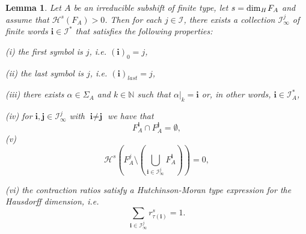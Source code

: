 \documentclass[11pt,english,british]{article}
\numberwithin{equation}{section}
\newtheorem{lma}[thm]{Lemma}
\begin{document}
\begin{lma} \label{exhaust}
Let $A$ be an irreducible subshift of finite type, let $s=\dim_{\emph{H}}F_{A}$
and assume that $\mathcal{H}^{s}(F_{A})>0$. Then for each $j\in\mathcal{I}$,
there exists a collection $\mathcal{I}_{\infty}^{j}$ of finite words
$\textbf{i}\in\mathcal{I}^{*}$ that satisfies the following properties:

\noindent (i) the first symbol is $j$, i.e. $(\textbf{i})_0=j$,

\noindent (ii) the last symbol is $j$, i.e. $(\textbf{i})_{last}=j$,

\noindent (iii) there exists $\alpha\in\Sigma_{A}$ and $k\in\mathbb{N}$ such
that $\alpha\vert_{k}=\textbf{i}$ or, in other words, $\textbf{i}\in\mathcal{I}^{*}_A$,

\noindent (iv) for $\textbf{i},\textbf{j}\in\mathcal{I}_{\infty}^{j}$
with $\textbf{i}\neq\textbf{j}$ we have
that
\[
F_{A}^{\textbf{i}}\cap F_{A}^{\textbf{j}}=\emptyset,
\]
 (v) 
\[
\mathcal{H}^{s}\left(F_{A}^{j}\setminus\left(\bigcup_{\textbf{i}\in\mathcal{I}_{\infty}^{j}}F_{A}^{\textbf{i}}\right)\right)=0,
\]


\noindent (vi) the contraction ratios satisfy a Hutchinson-Moran type
expression for the Hausdorff dimension, i.e.
\[
\sum_{\textbf{i}\in\mathcal{I}_{\infty}^{j}}r_{\tau(\textbf{i})}^{s}=1.
\]

\end{lma}
\end{document}
